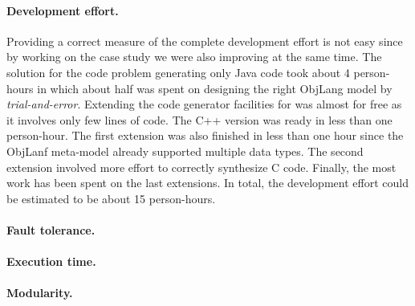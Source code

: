 \paragraph{Development effort.}

Providing a correct measure of the complete development effort is not easy since by working on the case study we were also improving \SIGMA at the same time.
The solution for the code problem generating only Java code took about 4 person-hours in which about half was spent on designing the right ObjLang model by \emph{trial-and-error}.
Extending the code generator facilities for \Csharp was almost for free as it involves only few lines of code.
The C++ version was ready in less than one person-hour.
The first extension was also finished in less than one hour since the ObjLanf meta-model already supported multiple data types.
The second extension involved more effort to correctly synthesize C code.
Finally, the most work has been spent on the last extensions.
In total, the development effort could be estimated to be about 15 person-hours.

\paragraph{Fault tolerance.}


\paragraph{Execution time.}


\paragraph{Modularity.}

